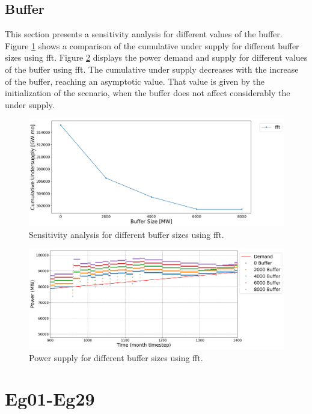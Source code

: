 \documentclass[11pt]{article}
\begin{document}
\subsection{Buffer}

This section presents a sensitivity analysis for different values of the buffer. Figure \ref{fig:24-buff} shows a comparison of the cumulative under supply for different buffer sizes using fft. Figure \ref{fig:24-buf-fft} displays the power demand and supply for different values of the buffer using fft. The cumulative under supply decreases with the increase of the buffer, reaching an asymptotic value. That value is given by the initialization of the scenario, when the buffer does not affect considerably the under supply.

\begin{figure}[H]
	\centering
	\includegraphics[width=\textwidth]{24-figures/24-sens-buffer.png} 
	\hfill
	\caption{Sensitivity analysis for different buffer sizes using fft.}
	\label{fig:24-buff}
\end{figure}

\begin{figure}[H]
	\centering
	\includegraphics[width=\textwidth]{24-figures/24-power-buffer-fft.png} 
	\hfill
	\caption{Power supply for different buffer sizes using fft.}
	\label{fig:24-buf-fft}
\end{figure}

\section{Eg01-Eg29}
\end{document}
